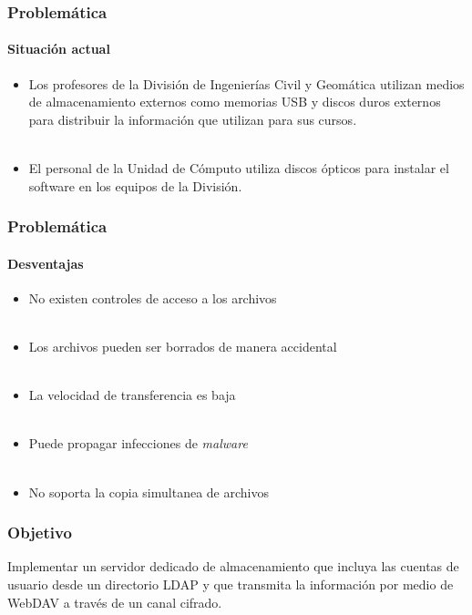 \documentclass{beamer}
\begin{document}
\begin{frame}
\frametitle{Problem\'{a}tica}
\framesubtitle{Situaci\'{o}n actual}

\begin{itemize}
\justifying
  \item Los profesores de la Divisi\'{o}n de Ingenier\'{i}as Civil y Geom\'{a}tica utilizan medios de almacenamiento externos como memorias USB y discos duros externos para distribuir la informaci\'{o}n que utilizan para sus cursos.
\\~\\
  \item El personal de la Unidad de C\'{o}mputo utiliza discos \'{o}pticos para instalar el software en los equipos de la Divisi\'{o}n.
\end{itemize}

\centering
 {
  
 }

\end{frame}
\begin{frame}
\frametitle{Problem\'{a}tica}
\framesubtitle{Desventajas}
\justifying

\begin{itemize}
\justifying
  \item No existen controles de acceso a los archivos
\\~\\
  \item Los archivos pueden ser borrados de manera accidental
\\~\\
  \item La velocidad de transferencia es baja
\\~\\
  \item Puede propagar infecciones de \textit{malware}
\\~\\
  \item No soporta la copia simultanea de archivos
\end{itemize}

\end{frame}
\begin{frame}

\frametitle{Objetivo}
\justifying

Implementar un servidor dedicado de almacenamiento que incluya las cuentas de usuario desde un directorio \textup{LDAP} y que transmita la informaci\'{o}n por medio de \textup{WebDAV} a trav\'{e}s de un canal cifrado.

\vspace{3em}

\centering
 {
  
 }

\end{frame}
\end{document}
